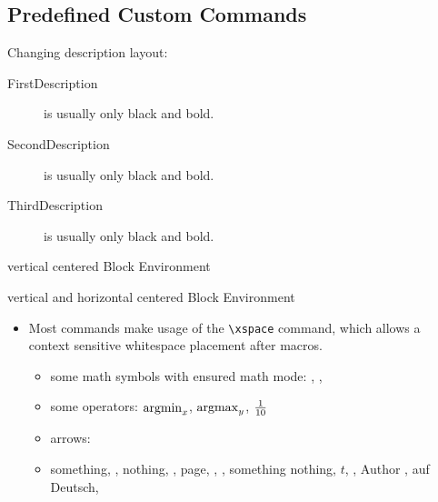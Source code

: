 \documentclass[11pt,a4paper,landscape]{article}
\begin{document}
\NewPage\subsection{Predefined Custom Commands}
\begin{block}
Changing description layout:
\begin{description}
  \item[FirstDescription] is usually only black and bold.
  \item[SecondDescription] is usually only black and bold.
  \item[ThirdDescription] is usually only black and bold.
\end{description}
\vfill
\end{block}

\begin{block}
  vertical centered Block Environment
\end{block}

\begin{hvcenter}
  vertical and horizontal centered Block Environment
\end{hvcenter}

\begin{block}
  \begin{itemize}
  \item Most commands make usage of the \texttt{\textbackslash xspace} command, which
    allows a context sensitive whitespace placement after macros.
    \begin{itemize}
    \item some math symbols with ensured math mode: \nat, \rel, \congmod
    \item some operators: $\argmin_{x}$, $\argmax_{y}$, $\frac{1}{10}$
    \item arrows: \ra
    \item \eg something, \Eg, \ie nothing, \Ie, \cf page, \Cf, \etc, something
      \vs nothing, \wrt $t$, \dof, Author \etal, \zB auf Deutsch, \ZB
    \end{itemize}
  \end{itemize}
\end{block}
\end{document}

